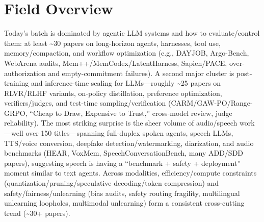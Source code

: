 \documentclass[12pt,letterpaper]{article}
\begin{document}
\medskip



\section*{Field Overview}
{\footnotesize Today's batch is dominated by agentic LLM systems and how to evaluate/control them: at least \textasciitilde{}30 papers on long-horizon agents, harnesses, tool use, memory/compaction, and workflow optimization (e.g., DAYJOB, Argo-Bench, WebArena audits, Mem++/MemCodex/LatentHarness, Sapien/PACE, over-authorization and empty-commitment failures). A second major cluster is post-training and inference-time scaling for LLMs---roughly \textasciitilde{}25 papers on RLVR/RLHF variants, on-policy distillation, preference optimization, verifiers/judges, and test-time sampling/verification (CARM/GAW-PO/Range-GRPO, ``Cheap to Draw, Expensive to Trust,'' cross-model review, judge reliability). The most striking surprise is the sheer volume of audio/speech work---well over 150 titles---spanning full-duplex spoken agents, speech LLMs, TTS/voice conversion, deepfake detection/watermarking, diarization, and audio benchmarks (HEAR, VoxMem, SpeechConversationBench, many ADD/SDD papers), suggesting speech is having a ``benchmark + safety + deployment'' moment similar to text agents. Across modalities, efficiency/compute constraints (quantization/pruning/speculative decoding/token compression) and safety/fairness/unlearning (bias audits, safety routing fragility, multilingual unlearning loopholes, multimodal unlearning) form a consistent cross-cutting trend (\textasciitilde{}30+ papers).}
\end{document}
